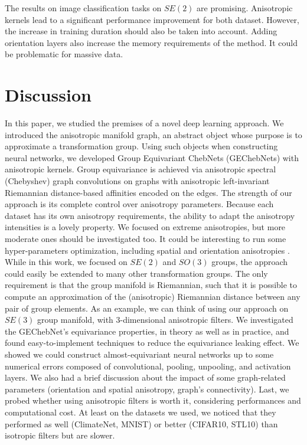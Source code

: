 \documentclass{article}
\newcommand{\haguettaz}[1]{{\color[rgb]{.8,.3,.2}{#1}}}
\begin{document}
The results on image classification tasks on $SE(2)$ are promising. Anisotropic kernels lead to a significant performance improvement for both dataset. However, the increase in training duration should also be taken into account. Adding orientation layers also increase the memory requirements of the method. It could be problematic for massive data. \haguettaz{comment so3 performance + add something about mAP and per class accuracy}

\section{Discussion} \label{sec:discussion}

In this paper, we studied the premises of a novel deep learning approach. We introduced the anisotropic manifold graph, an abstract object whose purpose is to approximate a transformation group. Using such objects when constructing neural networks, we developed Group Equivariant ChebNets (GEChebNets) with anisotropic kernels. Group equivariance is achieved via anisotropic spectral (Chebyshev) graph convolutions on graphs with anisotropic left-invariant Riemannian distance-based affinities encoded on the edges. The strength of our approach is its complete control over anisotropy parameters. Because each dataset has its own anisotropy requirements, the ability to adapt the anisotropy intensities is a lovely property. We focused on extreme anisotropies, but more moderate ones should be investigated too. It could be interesting to run some hyper-parameters optimization, including spatial and orientation anisotropies \citep{yu2020hyper}. While in this work, we focused on $SE(2)$ and $SO(3)$ groups, the approach could easily be extended to many other transformation groups. The only requirement is that the group manifold is Riemannian, such that it is possible to compute an approximation of the (anisotropic) Riemannian distance between any pair of group elements. As an example, we can think of using our approach on $SE(3)$ group manifold, with 3-dimensional anisotropic filters. We investigated the GEChebNet's equivariance properties, in theory as well as in practice, and found easy-to-implement techniques to reduce the equivariance leaking effect. We showed we could construct almost-equivariant neural networks up to some numerical errors composed of convolutional, pooling, unpooling, and activation layers. We also had a brief discussion about the impact of some graph-related parameters (orientation and spatial anisotropy, graph's connectivity). Last, we probed whether using anisotropic filters is worth it, considering performances and computational cost. At least on the datasets we used, we noticed that they performed as well (ClimateNet, MNIST) or better (CIFAR10, STL10) than isotropic filters but are slower.
\end{document}

